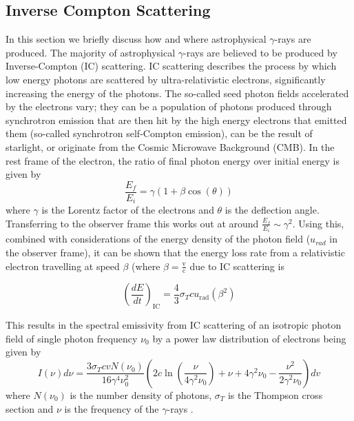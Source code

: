 \subsection{Inverse Compton Scattering}

In this section we briefly discuss how and where astrophysical $\gamma$-rays are produced. The majority of astrophysical $\gamma$-rays are believed to be produced by Inverse-Compton (IC) scattering. IC scattering describes the process by which low energy photons are scattered by ultra-relativistic electrons, significantly increasing the energy of the photons. The so-called seed photon fields accelerated by the electrons vary; they can be a population of photons produced through synchrotron emission that are then hit by the high energy electrons that emitted them (so-called synchrotron self-Compton emission), can be the result of starlight, or originate from the Cosmic Microwave Background (CMB). In the rest frame of the electron, the ratio of final photon energy over initial energy is given by
\begin{equation}
    \frac{E_f}{E_i}=\gamma (1+\beta \cos(\theta))
\end{equation}
where $\gamma$ is the Lorentz factor of the electrons and $\theta$ is the deflection angle. Transferring to the observer frame this works out at around $\frac{E_f}{E_i}\sim \gamma^2$. Using this, combined with considerations of the energy density of the photon field ($u_{rad}$ in the observer frame), it can be shown \cite{longair} that the energy loss rate from a relativistic electron travelling at speed $\beta$ (where $\beta=\frac{\mathrm{v}}{\mathrm{c}}$ due to IC scattering is

\begin{equation}
    \left(\frac{dE}{dt}\right)_{\mathrm{IC}}=\frac{4}{3}\sigma_T c u_{\mathrm{rad}}\left(\beta^2\right)
\end{equation}

This results in the spectral emissivity from IC scattering of an isotropic photon field of single photon frequency $\nu_0$ by a power law distribution of electrons being given by 
\begin{equation}
    I(\nu)d\nu=\frac{3\sigma_TcvN(\nu_0)}{16\gamma^4\nu_0^2}\left(2c\ln\left(\frac{\nu}{4\gamma^2\nu_0}\right)+\nu+4\gamma^2\nu_0-\frac{\nu^2}{2\gamma^2\nu_0}\right)dv
\end{equation}
where $N(\nu_0)$ is the number density of photons, $\sigma_T$ is the Thompson cross section and $\nu$ is the frequency of the $\gamma$-rays \cite{blumenthal}.


